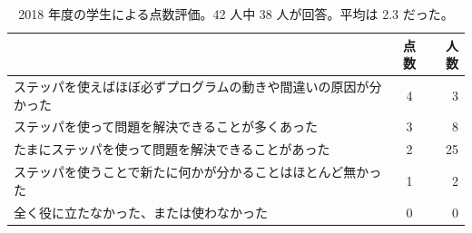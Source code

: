 \begin{table}
  \begin{center}
  \begin{tabular}{|l|c|r|}
    \hline
    & 点数 & 人数 \\ \hline
    ステッパを使えばほぼ必ずプログラムの動きや間違いの原因が分かった & 4 & 3\\ \hline
    ステッパを使って問題を解決できることが多くあった & 3 & 8\\ \hline
    たまにステッパを使って問題を解決できることがあった & 2 & 25\\ \hline
    ステッパを使うことで新たに何かが分かることはほとんど無かった & 1 & 2\\ \hline
    全く役に立たなかった、または使わなかった & 0 & 0\\ \hline
  \end{tabular}
  \end{center}
\caption[学生による点数評価]{2018 年度の学生による点数評価。42 人中 38 人が回答。平均は 2.3 だった。}
  \label{TableScore}
\end{table}

